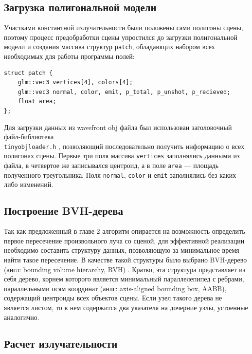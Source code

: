 \documentclass[12pt]{article}
\begin{document}
\subsection{Загрузка полигональной модели}
Участками константной излучательности были положены сами полигоны сцены, поэтому процесс предобработки сцены упростился до загрузки полигональной модели и создания массива структур \texttt{patch}, обладающих набором всех необходимых для работы программы полей:
\begin{lstlisting}
struct patch {
    glm::vec3 vertices[4], colors[4];
    glm::vec3 normal, color, emit, p_total, p_unshot, p_recieved;
    float area;
};
\end{lstlisting}

Для загрузки данных из wavefront obj файла был использован заголовочный файл-библиотека\\ \texttt{tinyobjloader.h} \cite{Fuj12}, позволяющий последовательно получить информацию о всех полигонах сцены. Первые три поля массива \texttt{vertices} заполнялись данными из файла, в четвертое же записывался центроид, а в поле \texttt{area} --- площадь полученного треугольника. Поля \texttt{normal}, \texttt{color} и \texttt{emit} заполнялись без каких-либо изменений.
\subsection{Построение BVH-дерева}
Так как предложенный в главе 2 алгоритм опирается на возможность определить первое пересечение произвольного луча со сценой, для эффективной реализации необходимо составить структуру данных, позволяющую за минимальное время найти такое пересечение. В качестве такой структуры было выбрано BVH-дерево (англ: bounding volume hierarchy, BVH) \cite{KK86}. Кратко, эта структура представляет из себя дерево, корнем которого является минимальный параллелепипед с ребрами, параллельными осям координат (анлг: axis-aligned bounding box, AABB), содержащий центроиды всех объектов сцены. Если узел такого дерева не является листом, то в нем содержится два указателя на дочерние узлы, устоенные аналогично. 
\subsection{Расчет излучательности}
\end{document}
